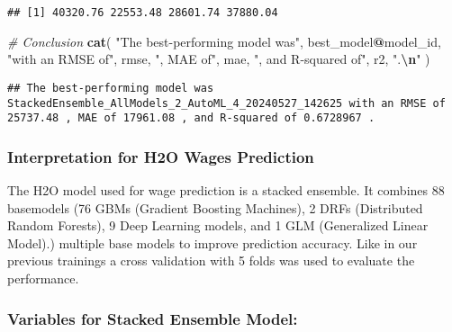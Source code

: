 \documentclass[
]{article}
\newenvironment{Shaded}{\begin{snugshade}}{\end{snugshade}}
\newcommand{\CommentTok}[1]{\textcolor[rgb]{0.56,0.35,0.01}{\textit{#1}}}
\newcommand{\FunctionTok}[1]{\textcolor[rgb]{0.13,0.29,0.53}{\textbf{#1}}}
\newcommand{\NormalTok}[1]{#1}
\newcommand{\OtherTok}[1]{\textcolor[rgb]{0.56,0.35,0.01}{#1}}
\newcommand{\SpecialCharTok}[1]{\textcolor[rgb]{0.81,0.36,0.00}{\textbf{#1}}}
\newcommand{\StringTok}[1]{\textcolor[rgb]{0.31,0.60,0.02}{#1}}
\begin{document}
\begin{Shaded}
\end{Shaded}

\begin{verbatim}
## [1] 40320.76 22553.48 28601.74 37880.04
\end{verbatim}

\begin{Shaded}
\begin{Highlighting}[]
\CommentTok{\# Conclusion}
\FunctionTok{cat}\NormalTok{(}
  \StringTok{"The best{-}performing model was"}\NormalTok{, best\_model}\SpecialCharTok{@}\NormalTok{model\_id,}
  \StringTok{"with an RMSE of"}\NormalTok{, rmse, }\StringTok{", MAE of"}\NormalTok{, mae, }\StringTok{", and R{-}squared of"}\NormalTok{, r2, }\StringTok{".}\SpecialCharTok{\textbackslash{}n}\StringTok{"}
\NormalTok{)}
\end{Highlighting}
\end{Shaded}

\begin{verbatim}
## The best-performing model was StackedEnsemble_AllModels_2_AutoML_4_20240527_142625 with an RMSE of 25737.48 , MAE of 17961.08 , and R-squared of 0.6728967 .
\end{verbatim}

\subsubsection{Interpretation for H2O Wages
Prediction}\label{interpretation-for-h2o-wages-prediction}

The H2O model used for wage prediction is a stacked ensemble. It
combines 88 basemodels (76 GBMs (Gradient Boosting Machines), 2 DRFs
(Distributed Random Forests), 9 Deep Learning models, and 1 GLM
(Generalized Linear Model).) multiple base models to improve prediction
accuracy. Like in our previous trainings a cross validation with 5 folds
was used to evaluate the performance.

\subsubsection{Variables for Stacked Ensemble
Model:}\label{variables-for-stacked-ensemble-model}
\end{document}
